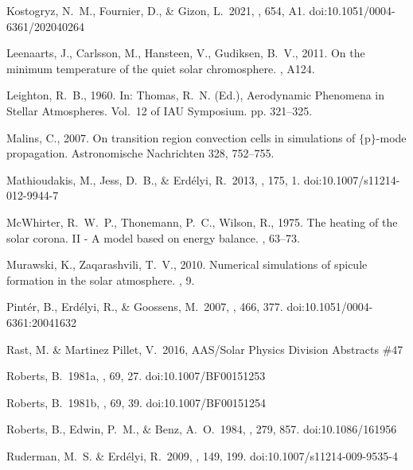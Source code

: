 \documentclass[linenumbers]{aastex63}
\begin{document}
\begin{thebibliography}{}
 Kostogryz, N.~M., Fournier, D., \& Gizon, L.\ 2021, \aap, 654, A1. doi:10.1051/0004-6361/202040264



{Leenaarts}, J., {Carlsson}, M., {Hansteen}, V., {Gudiksen}, B.~V., 2011. {On
  the minimum temperature of the quiet solar chromosphere}. , A124.


{Leighton}, R.~B., 1960. In: {Thomas}, R.~N. (Ed.), Aerodynamic Phenomena in
  Stellar Atmospheres. Vol.~12 of IAU Symposium. pp. 321--325.

{Malins}, C., 2007. {On transition region convection cells in simulations of
  $\{$p$\}$-mode propagation}. Astronomische Nachrichten 328, 752--755.

 Mathioudakis, M., Jess, D.~B., \& Erd{\'e}lyi, R.\ 2013, \ssr, 175, 1. doi:10.1007/s11214-012-9944-7


{McWhirter}, R.~W.~P., {Thonemann}, P.~C., {Wilson}, R., 1975. {The heating of
  the solar corona. II - A model based on energy balance}. , 63--73.

{Murawski}, K., {Zaqarashvili}, T.~V., 2010. {Numerical simulations of spicule
  formation in the solar atmosphere}. , 9.

 Pint{\'e}r, B., Erd{\'e}lyi, R., \& Goossens, M.\ 2007, \aap, 466, 377. doi:10.1051/0004-6361:20041632

 Rast, M. \& Martinez Pillet, V.\ 2016, AAS/Solar Physics Division Abstracts \#47


 Roberts, B.\ 1981a, \solphys, 69, 27. doi:10.1007/BF00151253

 Roberts, B.\ 1981b, \solphys, 69, 39. doi:10.1007/BF00151254

 Roberts, B., Edwin, P.~M., \& Benz, A.~O.\ 1984, \apj, 279, 857. doi:10.1086/161956

 Ruderman, M.~S. \& Erd{\'e}lyi, R.\ 2009, \ssr, 149, 199. doi:10.1007/s11214-009-9535-4




\end{thebibliography}
\end{document}

